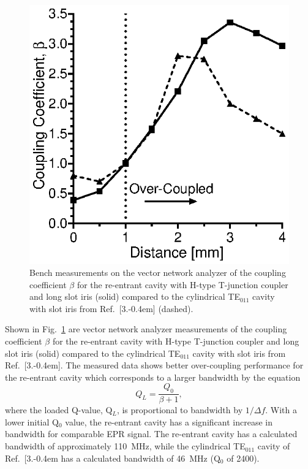 \begin{figure}[htb]\centering
 \includegraphics{Kapitel/Ch2-Images/08-couplingcoeff.eps}
 \caption[Bench measurements of the coupling coefficient.]{Bench measurements on the vector network analyzer of the coupling coefficient $\beta$  for the re-entrant \cylTE{} cavity with H-type T-junction coupler and long slot iris (solid) compared to the cylindrical TE$_{011}$ cavity with slot iris from Ref.~[3.\kern-0.4em] (dashed).}
 \label{Ch2-fig:coupling}
\end{figure}

Shown in Fig.~\ref{Ch2-fig:coupling} are vector network analyzer measurements of the coupling coefficient $\beta$ for the re-entrant \cylTE{} cavity with H-type T-junction coupler and long slot iris (solid) compared to the cylindrical TE$_{011}$ cavity with slot iris from Ref.~[3.\kern-0.4em]. The measured data shows better over-coupling performance for the re-entrant \cylTE{} cavity which corresponds to a larger bandwidth by the equation
\begin{equation}
    Q_L = \frac{Q_0}{\beta+1},
\end{equation}
where the loaded Q-value, Q$_L$, is proportional to bandwidth by $1/\Delta f$. \cite{ramo1984fields} With a lower initial Q$_0$ value, the re-entrant \cylTE{} cavity has a significant increase in bandwidth for comparable EPR signal. The re-entrant \cylTE{} cavity has a calculated bandwidth of approximately 110~MHz, while the cylindrical TE$_{011}$ cavity of Ref.~[3.\kern-0.4em has a calculated bandwidth of 46~MHz (Q$_0$ of 2400).

